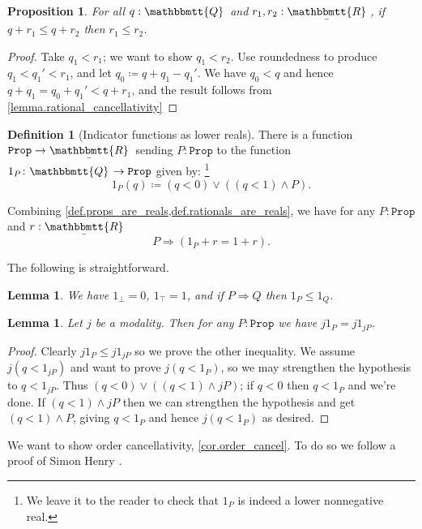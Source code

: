 \documentclass[11pt, oneside, article]{memoir}
\theoremstyle{plain}
\newtheorem{proposition}[theorem]{Proposition}
\newtheorem{lemma}[theorem]{Lemma}
\theoremstyle{definition}
\newtheorem{definition}[theorem]{Definition}
\theoremstyle{remark}
\newcommand{\const}[1]{\mathtt{#1}}
\newcommand{\ubar}[1]{\underaccent{\bar}{#1}}
\newcommand{\ind}[1]{1_{#1}}
\newcommand{\internal}[1]{\raisebox{-.03ex}{$\mathbbmtt{#1}$}}
\newcommand{\hs}{\hspace{1.1pt}}
\newcommand{\tqq}{\internal{Q}\hs}
\newcommand{\trr}{\internal{R}\hs}
\newcommand{\tlrr}{\ubar{\trr}\hs}
\newcommand{\prop}{\const{Prop}}
\newcommand{\imp}{\Rightarrow}
\begin{document}
\begin{proposition}\label{prop.cancel_rationals}
For all $q:\tqq$ and $r_1,r_2:\tlrr$, if $q+r_1\leq q+r_2$ then $r_1\leq r_2$.
\end{proposition}
\begin{proof}
Take $q_1<r_1$; we want to show $q_1<r_2$. Use roundedness to produce $q_1<q_1'<r_1$, and let $q_0\coloneqq q+q_1-q_1'$. We have $q_0<q$ and hence $q+q_1=q_0+q_1'<q+r_1$, and the result follows from \cref{lemma.rational_cancellativity}
\end{proof}

\begin{definition}[Indicator functions as lower reals]\label{def.props_are_reals}
There is a function $\prop\to\tlrr$ sending $P:\prop$ to the function $\ind{P}\colon\tqq\to\prop$ given by:%
\footnote{We leave it to the reader to check that $\ind{P}$ is indeed a lower nonnegative real.}
\[\ind{P}(q)\coloneqq(q<0)\vee ((q<1)\wedge P).\]
\end{definition}

Combining \cref{def.props_are_reals,def.rationals_are_reals}, we have for any $P:\prop$ and $r:\tlrr$
\begin{equation}\label{eqn.indicator}
P\imp (\ind{P}+r=1+r).
\end{equation}

The following is straightforward.
\begin{lemma}\label{lemma.ind_monotonic}
We have $\ind{\bot}=0$, $\ind{\top}=1$, and if $P\imp Q$ then $\ind{P}\leq\ind{Q}$.
\end{lemma}

\begin{lemma}\label{lemma.j_indicator}
Let $j$ be a modality. Then for any $P:\prop$ we have $j\ind{P}=j\ind{jP}$.
\end{lemma}
\begin{proof}
Clearly $j\ind{P}\leq j\ind{jP}$ so we prove the other inequality. We assume $j(q<\ind{jP})$ and want to prove $j(q<\ind{P})$, so we may strengthen the hypothesis to $q<\ind{jP}$. Thus $(q<0)\vee((q<1)\wedge jP)$; if $q<0$ then $q<\ind{P}$ and we're done. If $(q<1)\wedge jP$ then we can strengthen the hypothesis and get $(q<1)\wedge P$, giving $q<\ind{P}$ and hence $j(q<\ind{P})$ as desired.
\end{proof}

We want to show order cancellativity, \cref{cor.order_cancel}. To do so we follow a proof of Simon Henry \cite{henry2012simplification}.
\end{document}
